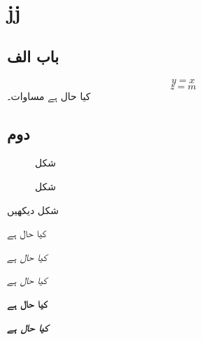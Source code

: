 
\chapter{jj}
\section{باب الف}
\begin{equation}
y=x
\end{equation}
\begin{equation}\label{مساوات_الف}
z=m
\end{equation}
کیا حال ہے مساوات۔

\section{دوم}

\begin{figure}
\caption{شکل}
\label{شکل_الف}
\end{figure}

\begin{figure}
\caption{شکل}
\label{شکل_دوم}
\end{figure}
شکل   دیکھیں

\textup{کیا حال ہے}

\textit{کیا حال ہے}

\textsl{کیا حال ہے}

\textbf{کیا حال ہے}

\textbf{\textsl{کیا حال ہے}}


